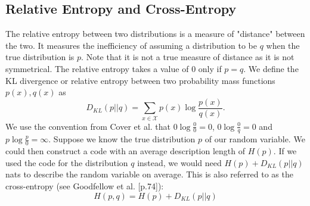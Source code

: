 \subsection{Relative Entropy and Cross-Entropy}
The relative entropy between two distributions is a measure of "distance" between the two. It measures the inefficiency of assuming a distribution to be $q$ when the true distribution is $p$. Note that it is not a true measure of distance as it is not symmetrical. The relative entropy takes a value of $0$ only if $p = q$.
We define the KL divergence or relative entropy between two probability mass functions $p(x), q(x)$ as
\begin{equation}
    D_{KL}(p||q) = \sum_{x \in \mathcal{X}} p(x)\log \frac{p(x)}{q(x)}.
\end{equation}
We use the convention from Cover et al. \cite{Cover2005} that $0 \log \frac{0}{0} = 0$, $0 \log \frac{0}{q} = 0$ and $p \log \frac{p}{0} = \infty$.
Suppose we know the true distribution $p$ of our random variable. We could then construct a code with an average description length of $H(p)$. If we used the code for the distribution $q$ instead, we would need $H(p) + D_{KL}(p||q)$ nats to describe the random variable on average. This is also referred to as the cross-entropy (see Goodfellow et al. \cite{Goodfellow-et-al-2016}[p.74]):
\begin{equation}
    H(p,q) =  H(p) + D_{KL}(p||q)
\end{equation}



